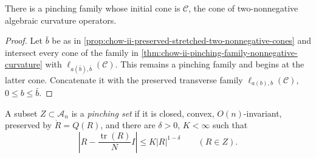 \begin{corollary}
  \label{cor:chow-ii-pinching-family-two-nonnegative}
  There is a pinching family whose initial cone is \(\mathcal C\), the cone of
  two-nonnegative algebraic curvature operators.
\end{corollary}
\begin{proof}
\sketch
  Let \(\bar b\) be as in
  \ref{prop:chow-ii-preserved-stretched-two-nonnegative-cones} and intersect
  every cone of the family in
  \ref{thm:chow-ii-pinching-family-nonnegative-curvature} with
  \(\ell_{a(\bar b),\bar b}(\mathcal C)\).  This remains a pinching family and
  begins at the latter cone.  Concatenate it with the preserved transverse
  family \(\ell_{a(b),b}(\mathcal C)\), \(0\le b\le\bar b\).
\end{proof}

\begin{definition}
  \label{def:chow-ii-pinching-set}
  A subset \(Z\subset\mathcal A_n\) is a \emph{pinching set} if it is closed,
  convex, \(O(n)\)-invariant, preserved by \(\dot R=Q(R)\), and there are
  \(\delta>0\), \(K<\infty\) such that
  \[
    \left|R-\frac{\operatorname{tr}(R)}N I\right|
       \le K|R|^{1-\delta}\qquad(R\in Z).
  \]
\end{definition}

